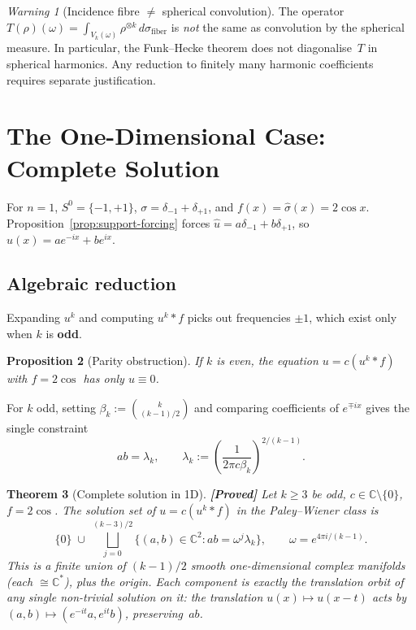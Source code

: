 \documentclass[12pt]{article}
\newtheorem{theorem}{Theorem}[section]
\newtheorem{proposition}[theorem]{Proposition}
\theoremstyle{definition}
\theoremstyle{remark}
\newtheorem{warning}[theorem]{Warning}
\newcommand{\C}{\mathbb{C}}
\newcommand{\wh}{\widehat}
\newcommand{\proven}{\textbf{\color{teal}[Proved]}}
\begin{document}
\begin{warning}[Incidence fibre $\neq$ spherical convolution]
  \label{warn:not-convolution}
  The operator $T(\rho)(\omega)=\int_{V_k(\omega)}\rho^{\otimes k}\,
  d\sigma_\mathrm{fiber}$ is \emph{not} the same as convolution by the
  spherical measure.  In particular, the Funk--Hecke theorem does not
  diagonalise~$T$ in spherical harmonics.  Any reduction to finitely many
  harmonic coefficients requires separate justification.
\end{warning}

\section{The One-Dimensional Case: Complete Solution}
\label{sec:1D}

For $n=1$, $S^0=\{-1,+1\}$, $\sigma=\delta_{-1}+\delta_{+1}$, and
$f(x)=\wh\sigma(x)=2\cos x$.  Proposition~\ref{prop:support-forcing} forces
$\wh u=a\delta_{-1}+b\delta_{+1}$, so $u(x)=ae^{-ix}+be^{ix}$.

\subsection{Algebraic reduction}

Expanding $u^k$ and computing $u^k\ast f$ picks out frequencies
$\pm 1$, which exist only when $k$ is \textbf{odd}.

\begin{proposition}[Parity obstruction]
  If $k$ is even, the equation $u=c(u^k\ast f)$ with $f=2\cos$ has only
  $u\equiv 0$.
\end{proposition}

For $k$ odd, setting $\beta_k:=\binom{k}{(k-1)/2}$ and comparing coefficients
of $e^{\mp ix}$ gives the single constraint
\begin{equation}  \label{eq:constraint}
  ab = \lambda_k,
  \qquad
  \lambda_k := \left(\frac{1}{2\pi c\beta_k}\right)^{2/(k-1)}.
\end{equation}

\begin{theorem}[Complete solution in 1D]  \label{thm:main-1d}
  \proven\quad
  Let $k\geq 3$ be odd, $c\in\C\setminus\{0\}$, $f=2\cos$.
  The solution set of $u=c(u^k\ast f)$ in the Paley--Wiener class is
  \[
    \{0\}
    \;\cup\;
    \bigsqcup_{j=0}^{(k-3)/2}
      \{(a,b)\in\C^2:ab=\omega^j\lambda_k\},
    \qquad \omega=e^{4\pi i/(k-1)}.
  \]
  This is a finite union of $(k-1)/2$ smooth one-dimensional complex
  manifolds (each $\cong\C^*$), plus the origin.
  Each component is exactly the translation orbit of any single non-trivial
  solution on it: the translation $u(x)\mapsto u(x-t)$ acts by
  $(a,b)\mapsto(e^{-it}a,e^{it}b)$, preserving~$ab$.
\end{theorem}
\end{document}
